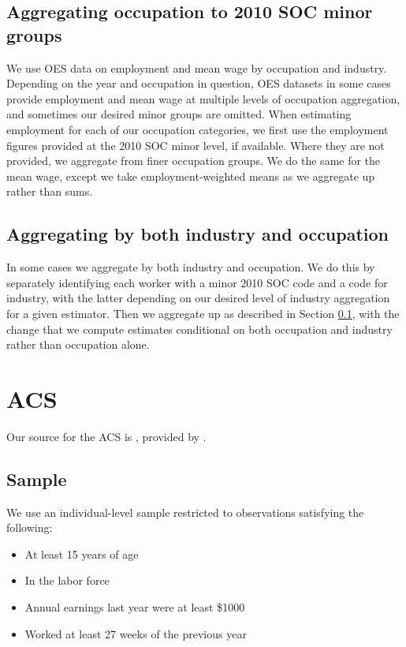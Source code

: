 \documentclass{article}
\begin{document}
\subsection{Aggregating occupation to 2010 SOC minor groups}
\label{OES: aggregation}
We use OES data on employment and mean wage by occupation and industry.
Depending on the year and occupation in question, OES datasets in some cases provide employment and mean wage at multiple levels of occupation aggregation, and sometimes our desired minor groups are omitted.
When estimating employment for each of our occupation categories, we first use the employment figures provided at the 2010 SOC minor level, if available. Where they are not provided, we aggregate from finer occupation groups. We do the same for the mean wage, except we take employment-weighted means as we aggregate up rather than sums.

\subsection{Aggregating by both industry and occupation}
In some cases we aggregate by both industry and occupation. We do this by separately identifying each worker with a minor 2010 SOC code and a code for industry, with the latter depending on our desired level of industry aggregation for a given estimator. Then we aggregate up as described in Section \ref{OES: aggregation}, with the change that we compute estimates conditional on both occupation and industry rather than occupation alone.

\section{ACS}
Our source for the ACS is \cite{ACS}, provided by \cite{IPUMS}.

\subsection{Sample}
We use an individual-level sample restricted to observations satisfying the following:
\begin{itemize}
\item At least 15 years of age
\item In the labor force
\item Annual earnings last year were at least \$1000
\item Worked at least 27 weeks of the previous year
\end{itemize}
\end{document}
